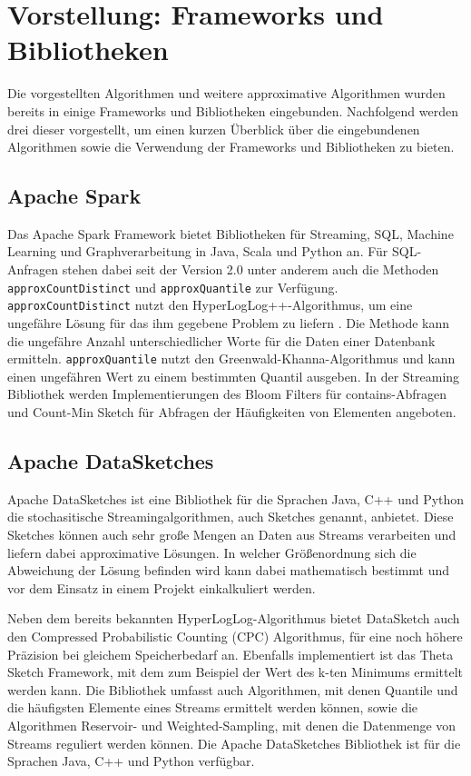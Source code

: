\section{Vorstellung: Frameworks und Bibliotheken}
Die vorgestellten Algorithmen und weitere approximative Algorithmen wurden bereits in einige Frameworks und Bibliotheken eingebunden. Nachfolgend werden drei dieser vorgestellt, um einen kurzen Überblick über die eingebundenen Algorithmen sowie die Verwendung der Frameworks und Bibliotheken zu bieten.

\subsection{Apache Spark}
Das Apache Spark Framework bietet Bibliotheken für Streaming, SQL, Machine Learning und Graphverarbeitung in Java, Scala und Python an. 
Für SQL-Anfragen stehen dabei seit der Version 2.0 unter anderem auch die Methoden \texttt{approxCountDistinct} 
und \texttt{approxQuantile} zur Verfügung. 
\texttt{approxCountDistinct} nutzt den Hyper\-LogLog++-Algorithmus, 
um eine ungefähre Lösung für das ihm gegebene Problem zu liefern \cite{hunter2016}.
Die Methode kann die ungefähre Anzahl unterschiedlicher Worte für die Daten einer Datenbank ermitteln.
\texttt{approxQuantile} nutzt den Greenwald-Khanna-Algorithmus \cite{greenwald2001} 
und kann einen ungefähren Wert zu einem bestimmten Quantil ausgeben.
In der Streaming Bibliothek werden Implementierungen des Bloom Filters für contains-Abfragen und Count-Min Sketch für Abfragen der Häufigkeiten von Elementen angeboten.

\subsection{Apache DataSketches}
Apache DataSketches ist eine Bibliothek für die Sprachen Java, C++ und Python die stochasitische Streamingalgorithmen, 
auch Sketches genannt, anbietet. 
Diese Sketches können auch sehr große Mengen an Daten aus Streams verarbeiten 
und liefern dabei approximative Lösungen. 
In welcher Größenordnung sich die Abweichung der Lösung befinden wird kann dabei mathematisch bestimmt 
und vor dem Einsatz in einem Projekt einkalkuliert werden.

Neben dem bereits bekannten HyperLogLog-Algorithmus bietet DataSketch auch den Compressed Probabilistic Counting (CPC) Algorithmus, 
für eine noch höhere Präzision bei gleichem Speicherbedarf an.
Ebenfalls implementiert ist das Theta Sketch Framework, 
mit dem zum Beispiel der Wert des k-ten Minimums ermittelt werden kann.
Die Bibliothek umfasst auch Algorithmen, mit denen Quantile und die häufigsten Elemente eines Streams ermittelt werden können, 
sowie die Algorithmen Reservoir- und Weighted-Sampling, mit denen die Datenmenge von Streams reguliert werden können.
Die Apache DataSketches Bibliothek ist für die Sprachen Java, C++ und Python verfügbar.

